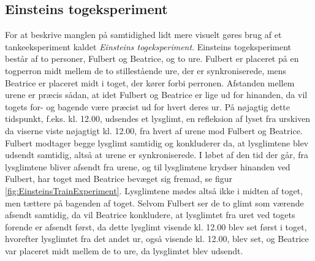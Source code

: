\subsection{Einsteins togeksperiment} \label{sec:tog}

For at beskrive manglen på samtidighed lidt mere visuelt gøres brug af et tankeeksperiment kaldet \emph{Einsteins togeksperiment}. Einsteins togeksperiment består af to personer, Fulbert og Beatrice, og to ure. Fulbert er placeret på en togperron midt mellem de to stillestående ure, der er synkroniserede, mens Beatrice er placeret midt i toget, der kører forbi perronen. Afstanden mellem urene er præcis sådan, at idet Fulbert og Beatrice er lige ud for hinanden, da vil togets for- og bagende være præcist ud for hvert deres ur. På nøjagtig dette tidspunkt, f.eks. kl. 12.00, udsendes et lysglimt, en refleksion af lyset fra urskiven da viserne viste nøjagtigt kl. 12.00, fra hvert af urene mod Fulbert og Beatrice. Fulbert modtager begge lysglimt samtidig og konkluderer da, at lysglimtene blev udsendt samtidig, altså at urene er synkroniserede. I løbet af den tid der går, fra lysglimtene bliver afsendt fra urene, og til lysglimtene krydser hinanden ved Fulbert, har toget med Beatrice bevæget sig fremad, se figur \ref{fig:EinsteinsTrainExperiment}. Lysglimtene mødes altså ikke i midten af toget, men tættere på bagenden af toget. Selvom Fulbert ser de to glimt som værende afsendt samtidig, da vil Beatrice konkludere, at lysglimtet fra uret ved togets forende er afsendt først, da dette lysglimt visende kl. 12.00 blev set først i toget, hvorefter lysglimtet fra det andet ur, også visende kl. 12.00, blev set, og Beatrice var placeret midt mellem de to ure, da lysglimtet blev udsendt.
%

